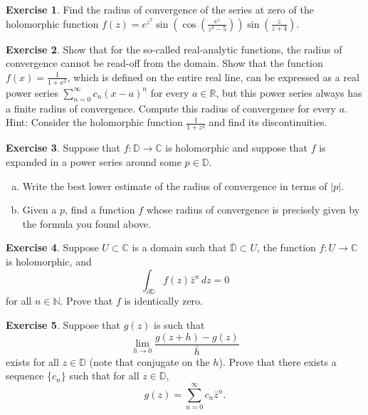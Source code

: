 \documentclass[12pt,openany]{book}
\newcommand{\sabs}[1]{\lvert {#1} \rvert}
\newcommand{\C}{{\mathbb{C}}}
\newcommand{\R}{{\mathbb{R}}}
\newcommand{\N}{{\mathbb{N}}}
\newcommand{\D}{{\mathbb{D}}}
\theoremstyle{plain}
\theoremstyle{remark}
\theoremstyle{definition}
\newenvironment{exbox}{%
    \def\FrameCommand{\vrule width 1pt \relax\hspace {10pt}}%
    \MakeFramed {\advance \hsize -\width \FrameRestore }%
}{%
    \endMakeFramed
}
\newenvironment{exparts}{%
    \leavevmode\begin{enumerate}[a),noitemsep,topsep=0pt,parsep=0pt,partopsep=0pt]
}{%
    \end{enumerate}
}
\theoremstyle{exercise}
\newtheorem{exercise}{Exercise}[section]
\theoremstyle{example}
\begin{document}
\begin{exbox}
\begin{exercise}
Find the radius of convergence of the series at zero of the holomorphic
function $f(z) =
e^{z^7}\sin\left(\cos\left(\frac{e^z}{z^2-5}\right)\right)\sin\left(\frac{z}{z+4}\right)$.
\end{exercise}

\begin{exercise}
Show that for the so-called real-analytic functions, the radius of
convergence cannot be read-off from the domain.
Show that the function $f(x) = \frac{1}{1+x^2}$,
which is defined on the
entire real line, can be expressed as a real power series
$\sum_{n=0}^\infty c_n {(x-a)}^n$ for every $a \in \R$, but
this power series always has a finite radius of convergence.
Compute this radius of convergence for every $a$.  Hint: Consider
the holomorphic function $\frac{1}{1+z^2}$ and find its discontinuities.
\end{exercise}

\begin{exercise}
Suppose that $f \colon \D \to \C$ is holomorphic and suppose that
$f$ is expanded in a power series around some $p \in \D$.
\begin{exparts}
\item
Write the best lower estimate of the radius of convergence in terms of
$\sabs{p}$.
\item
Given a $p$, find a function $f$ whose radius of convergence is precisely
given by the formula you found above.
\end{exparts}
\end{exercise}

\begin{exercise}
Suppose $U \subset \C$ is a domain such that $\overline{\D} \subset U$,
the function $f \colon U \to \C$ is holomorphic, and
\begin{equation*}
\int_{\partial \D} f(z) \bar{z}^n \, dz = 0
\end{equation*}
for all $n \in \N$.  Prove that $f$ is identically zero.
\end{exercise}

\begin{exercise}
Suppose that $g(z)$ is such that
\begin{equation*}
\lim_{h \to 0}
\frac{g(z+h)-g(z)}{\bar{h}}
\end{equation*}
exists for all $z \in \D$ (note that conjugate on the $h$).
Prove that there exists
a sequence $\{ c_n \}$ such that for all $z \in \D$,
\begin{equation*}
g(z) = \sum_{n=0}^\infty c_n \bar{z}^n .
\end{equation*}
\end{exercise}
\end{exbox}
\end{document}
